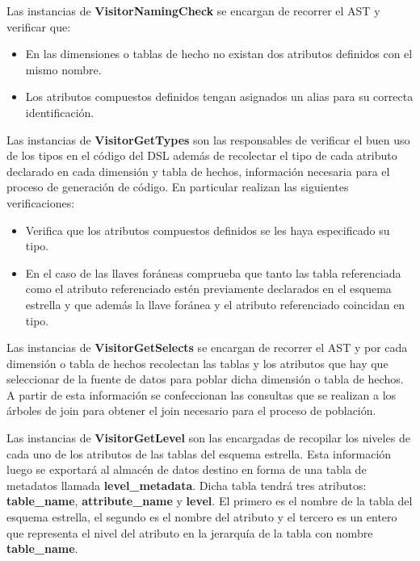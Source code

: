 Las instancias de \textbf{VisitorNamingCheck} se encargan de recorrer el AST y verificar que: 

\begin{itemize}
    \item En las dimensiones o tablas de hecho no existan dos atributos definidos con el mismo nombre.
    \item Los atributos compuestos definidos tengan asignados un alias para su correcta identificaci\'on.
\end{itemize}

Las instancias de \textbf{VisitorGetTypes} son las responsables de verificar el buen uso de los tipos en el 
c\'odigo del DSL adem\'as de recolectar el tipo de cada atributo declarado en cada dimensi\'on y 
tabla de hechos, 
informaci\'on necesaria para el proceso de generaci\'on de c\'odigo. En particular realizan 
las siguientes verificaciones: 

\begin{itemize}
    \item Verifica que los atributos compuestos definidos se les haya especificado su tipo.
    \item En el caso de las llaves for\'aneas comprueba que tanto las tabla referenciada como el atributo 
        referenciado est\'en previamente declarados en el esquema estrella y que adem\'as la llave for\'anea 
        y el atributo referenciado coincidan en tipo.
\end{itemize}

Las instancias de \textbf{VisitorGetSelects} se encargan de recorrer el AST y por cada dimensi\'on o tabla 
de hechos recolectan las tablas y los atributos que hay que seleccionar de la fuente de datos 
para poblar dicha dimensi\'on o tabla de hechos. A partir de esta informaci\'on se confeccionan las consultas 
que se realizan a los \'arboles de join para obtener el join necesario para el proceso de poblaci\'on.

Las instancias de \textbf{VisitorGetLevel} son las encargadas de recopilar los niveles de cada uno de los 
atributos de las tablas del esquema estrella. Esta informaci\'on luego se exportar\'a al almac\'en de datos 
destino en forma de una tabla de metadatos llamada \textbf{level\_metadata}. Dicha tabla tendr\'a tres atributos: 
\textbf{table\_name}, \textbf{attribute\_name} y \textbf{level}. El primero es el nombre de la tabla del esquema 
estrella, el segundo es el nombre del atributo y el tercero es un entero que representa el nivel del atributo 
en la jerarqu\'ia de la tabla con nombre \textbf{table\_name}.

